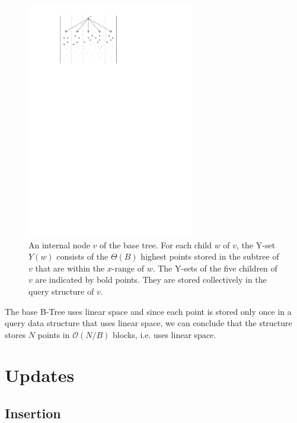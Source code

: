 \documentclass[twoside,11pt,openright]{report}
\begin{document}
\begin{figure}[h]
	\centering
	\includegraphics[width=0.65\textwidth]{../figures/arge_child_structure}
	\caption{An internal node $v$ of the base tree. For each child $w$ of $v$, the Y-set $Y(w)$ consists of the $\Theta(B)$ highest points stored in the subtree of $v$ that are within the $x$-range of $w$. The Y-sets of the five children of $v$ are indicated by bold points. They are stored collectively in the query structure of $v$.}
	\label{fig:arge_child_strucutre}
\end{figure}


The base B-Tree uses linear space and since each point is stored only once in a query data structure that uses linear space, we can conclude that the structure stores $N$ points in $\mathcal{O}(N/B)$ blocks, i.e. uses linear space.

\clearpage

\section{Updates}
\label{sec:arge_updates}
\subsection{Insertion}
\end{document}
